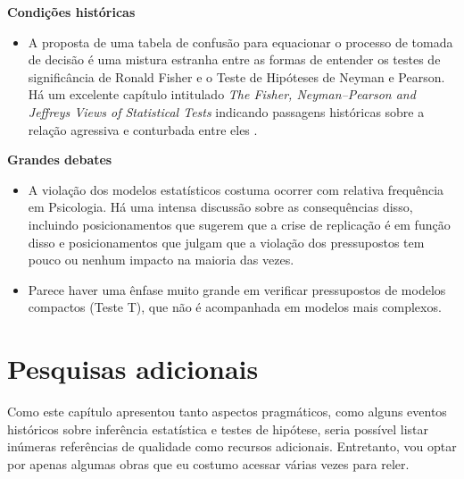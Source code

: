 \documentclass[
]{book}
\providecommand{\tightlist}{%
  \setlength{\itemsep}{0pt}\setlength{\parskip}{0pt}}
\begin{document}
\textbf{Condições históricas}

\begin{itemize}
\tightlist
\item
  A proposta de uma tabela de confusão para equacionar o processo de tomada de decisão é uma mistura estranha entre as formas de entender os testes de significância de Ronald Fisher e o Teste de Hipóteses de Neyman e Pearson. Há um excelente capítulo intitulado \emph{The Fisher, Neyman--Pearson and Jeffreys Views of Statistical Tests} indicando passagens históricas sobre a relação agressiva e conturbada entre eles \citep{Lecoutre2014}.
\end{itemize}

\textbf{Grandes debates}

\begin{itemize}
\item
  A violação dos modelos estatísticos costuma ocorrer com relativa frequência em Psicologia. Há uma intensa discussão sobre as consequências disso, incluindo posicionamentos que sugerem que a crise de replicação é em função disso e posicionamentos que julgam que a violação dos pressupostos tem pouco ou nenhum impacto na maioria das vezes.
\item
  Parece haver uma ênfase muito grande em verificar pressupostos de modelos compactos (Teste T), que não é acompanhada em modelos mais complexos.
\end{itemize}

\hypertarget{pesquisas-adicionais}{%
\section{Pesquisas adicionais}\label{pesquisas-adicionais}}

Como este capítulo apresentou tanto aspectos pragmáticos, como alguns eventos históricos sobre inferência estatística e testes de hipótese, seria possível listar inúmeras referências de qualidade como recursos adicionais. Entretanto, vou optar por apenas algumas obras que eu costumo acessar várias vezes para reler.
\end{document}
